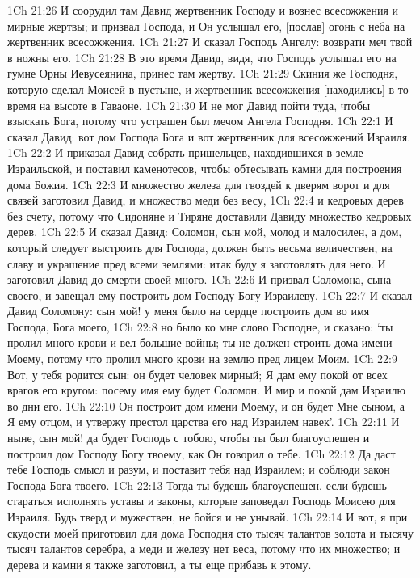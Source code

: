 1Ch 21:26  И соорудил там Давид жертвенник Господу и вознес всесожжения и мирные жертвы; и призвал Господа, и Он услышал его, [послав] огонь с неба на жертвенник всесожжения.
1Ch 21:27  И сказал Господь Ангелу: возврати меч твой в ножны его.
1Ch 21:28  В это время Давид, видя, что Господь услышал его на гумне Орны Иевусеянина, принес там жертву.
1Ch 21:29  Скиния же Господня, которую сделал Моисей в пустыне, и жертвенник всесожжения [находились] в то время на высоте в Гаваоне.
1Ch 21:30  И не мог Давид пойти туда, чтобы взыскать Бога, потому что устрашен был мечом Ангела Господня.
1Ch 22:1  И сказал Давид: вот дом Господа Бога и вот жертвенник для всесожжений Израиля.
1Ch 22:2  И приказал Давид собрать пришельцев, находившихся в земле Израильской, и поставил каменотесов, чтобы обтесывать камни для построения дома Божия.
1Ch 22:3  И множество железа для гвоздей к дверям ворот и для связей заготовил Давид, и множество меди без весу,
1Ch 22:4  и кедровых дерев без счету, потому что Сидоняне и Тиряне доставили Давиду множество кедровых дерев.
1Ch 22:5  И сказал Давид: Соломон, сын мой, молод и малосилен, а дом, который следует выстроить для Господа, должен быть весьма величествен, на славу и украшение пред всеми землями: итак буду я заготовлять для него. И заготовил Давид до смерти своей много.
1Ch 22:6  И призвал Соломона, сына своего, и завещал ему построить дом Господу Богу Израилеву.
1Ch 22:7  И сказал Давид Соломону: сын мой! у меня было на сердце построить дом во имя Господа, Бога моего,
1Ch 22:8  но было ко мне слово Господне, и сказано: `ты пролил много крови и вел большие войны; ты не должен строить дома имени Моему, потому что пролил много крови на землю пред лицем Моим.
1Ch 22:9  Вот, у тебя родится сын: он будет человек мирный; Я дам ему покой от всех врагов его кругом: посему имя ему будет Соломон. И мир и покой дам Израилю во дни его.
1Ch 22:10  Он построит дом имени Моему, и он будет Мне сыном, а Я ему отцом, и утвержу престол царства его над Израилем навек'.
1Ch 22:11  И ныне, сын мой! да будет Господь с тобою, чтобы ты был благоуспешен и построил дом Господу Богу твоему, как Он говорил о тебе.
1Ch 22:12  Да даст тебе Господь смысл и разум, и поставит тебя над Израилем; и соблюди закон Господа Бога твоего.
1Ch 22:13  Тогда ты будешь благоуспешен, если будешь стараться исполнять уставы и законы, которые заповедал Господь Моисею для Израиля. Будь тверд и мужествен, не бойся и не унывай.
1Ch 22:14  И вот, я при скудости моей приготовил для дома Господня сто тысяч талантов золота и тысячу тысяч талантов серебра, а меди и железу нет веса, потому что их множество; и дерева и камни я также заготовил, а ты еще прибавь к этому.
